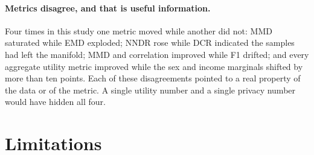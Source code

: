 \documentclass[11pt,a4paper]{article}
\begin{document}
\paragraph{Metrics disagree, and that is useful information.}
Four times in this study one metric moved while another did not: MMD saturated
while EMD exploded; NNDR rose while DCR indicated the samples had left the
manifold; MMD and correlation improved while F1 drifted; and every aggregate
utility metric improved while the sex and income marginals shifted by more
than ten points. Each of these disagreements pointed to a real property of the
data or of the metric. A single utility number and a single privacy number
would have hidden all four.

\section{Limitations}
\label{sec:limitations}
\end{document}
